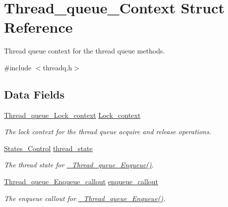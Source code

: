 \hypertarget{structThread__queue__Context}{}\section{Thread\+\_\+queue\+\_\+\+Context Struct Reference}
\label{structThread__queue__Context}


Thread queue context for the thread queue methods.  




{\ttfamily \#include $<$threadq.\+h$>$}

\subsection*{Data Fields}
\begin{DoxyCompactItemize}
\item 
\mbox{\label{structThread__queue__Context_a6fda2283b723f58b57e3e37f2a0e095b}} 
\mbox{\hyperlink{structThread__queue__Lock__context}{Thread\+\_\+queue\+\_\+\+Lock\+\_\+context}} \mbox{\hyperlink{structThread__queue__Context_a6fda2283b723f58b57e3e37f2a0e095b}{Lock\+\_\+context}}
\begin{DoxyCompactList}\small\item\em The lock context for the thread queue acquire and release operations. \end{DoxyCompactList}\item 
\mbox{\label{structThread__queue__Context_ab52d5818dcf0e8c9358a54f0b485a59c}} 
\mbox{\hyperlink{group__RTEMSScoreStates_gaeebbea0bfca162709b124fd519cf99d3}{States\+\_\+\+Control}} \mbox{\hyperlink{structThread__queue__Context_ab52d5818dcf0e8c9358a54f0b485a59c}{thread\+\_\+state}}
\begin{DoxyCompactList}\small\item\em The thread state for \mbox{\hyperlink{group__RTEMSScoreThreadQueue_ga4992b40810f6d287c832bdad240dbc90}{\+\_\+\+Thread\+\_\+queue\+\_\+\+Enqueue()}}. \end{DoxyCompactList}\item 
\mbox{\hyperlink{group__RTEMSScoreThreadQueue_ga3dd59055cd68c42978de9cd8e007ce1d}{Thread\+\_\+queue\+\_\+\+Enqueue\+\_\+callout}} \mbox{\hyperlink{structThread__queue__Context_a055ed1eda48ec4c2f7705dc8da30a0f5}{enqueue\+\_\+callout}}
\begin{DoxyCompactList}\small\item\em The enqueue callout for \mbox{\hyperlink{group__RTEMSScoreThreadQueue_ga4992b40810f6d287c832bdad240dbc90}{\+\_\+\+Thread\+\_\+queue\+\_\+\+Enqueue()}}. \end{DoxyCompactList}\item 

\end{DoxyCompactItemize}
